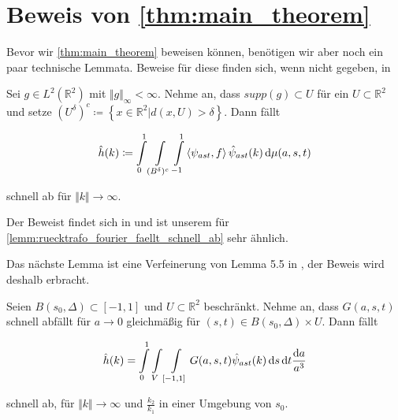 \section{\texorpdfstring{Beweis von \cref{thm:main_theorem}}{beweis des hauptsatzes}} %
\label{sec:beweis_von_thm:main_theorem}


Bevor wir \cref{thm:main_theorem} beweisen können, benötigen wir aber noch ein paar technische Lemmata. Beweise für diese finden sich, wenn nicht gegeben, in \cite{Kutyniok2008}

\begin{lemma}
\label{lemm:lemma54}
    Sei $g \in L^2(\mathbb{R}^2)$ mit $\Vert g\Vert_\infty < \infty$. Nehme an, dass $supp (g) \subset U$ für ein $U \subset \mathbb{R}^2$ und setze
    $(U^\delta)^c \coloneqq \left\{x \in \mathbb{R}^2 | d(x,U) > \delta\right\}$.
    Dann fällt

    \begin{equation*}
        \hat h(k) \coloneqq \int \limits_0^1 \int \limits_{(B^\delta)^c} \int \limits_{-1}^{1} \left<\psi_{ast},f\right> \hat \psi_{ast}(k) \mathop{}\!\mathrm{d} \mu (a,s,t)
    \end{equation*}

    schnell ab für $\Vert k \Vert \to \infty$.
\end{lemma}

Der Beweist findet sich in \cite{Kutyniok2008} und ist unserem für \cref{lemm:ruecktrafo_fourier_faellt_schnell_ab} sehr ähnlich.

Das nächste Lemma ist eine Verfeinerung von Lemma 5.5 in \textcite{Kutyniok2008}, der Beweis wird deshalb erbracht.
\begin{lemma}
\label{lemm:ruecktrafo_fourier_faellt_schnell_ab}

Seien $B(s_0,\Delta) \subset [-1,1]$ und $U \subset \mathbb{R}^2$ beschränkt. Nehme an, dass $G(a,s,t)$ schnell abfällt für $a \to 0$ gleichmäßig für $(s,t) \in  B(s_0,\Delta) \times U$. Dann fällt

\begin{equation*}
    \hat h(k) = \int \limits_0^1 \int \limits_V \int \limits_{[-1,1]}
    G(a,s,t) \hat \psi_{ast} (k)
        \mathop{}\!\mathrm{d} s \mathop{}\!\mathrm{d} t \frac{\mathop{}\!\mathrm{d} a}{a^3}
\end{equation*}

schnell ab, für $\Vert k \Vert \to \infty$ und $\frac{k_2}{k_1}$ in einer Umgebung von $s_0$.
\end{lemma}

